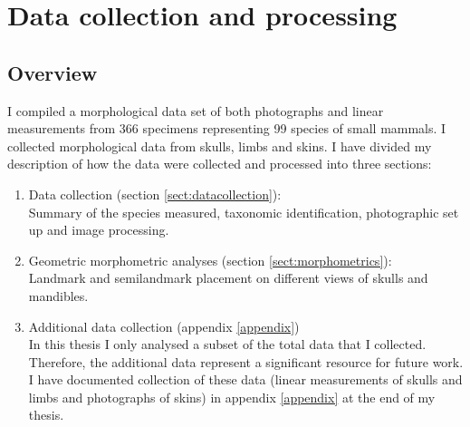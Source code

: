 
\chapter{Data collection and processing}
\label{chap:methods}


\section{Overview}

	I compiled a morphological data set of both photographs and linear measurements from 366 specimens representing 99 species of small mammals. 
	I collected morphological data from skulls, limbs and skins. I have divided my description of how the data were collected and processed into three sections:
	
	\begin{enumerate}[i]
	
	\item Data collection (section \ref{sect:datacollection}): \\
	Summary of the species measured, taxonomic identification,  photographic set up and image processing.
	
	\item Geometric morphometric analyses (section \ref{sect:morphometrics}):\\
	Landmark and semilandmark placement on different views of skulls and mandibles.
	
	
	\item Additional data collection (appendix \ref{appendix}) \\
	In this thesis I only analysed a subset of the total data that I collected. Therefore, the additional data represent a significant resource for future work. I have documented collection of these data (linear measurements of skulls and limbs and photographs of skins) in appendix \ref{appendix} at the end of my thesis.
	
	\end{enumerate} 



